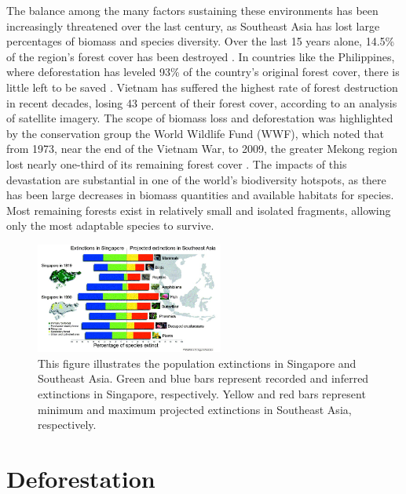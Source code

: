  The balance among the many factors sustaining these environments has been increasingly threatened over the last century, as Southeast Asia has lost large percentages of biomass and species diversity.  Over the last 15 years alone, 14.5\% of the region's forest cover has been destroyed \citep{gullison2007tropical}.  In countries like the Philippines, where deforestation has leveled 93\% of the country's original forest cover, there is little left to be saved \citep{sodhi2004southeast}. Vietnam has suffered the highest rate of forest destruction in recent decades, losing 43 percent of their forest cover, according to an analysis of satellite imagery. The scope of biomass loss and deforestation was highlighted by the conservation group the World Wildlife Fund (WWF), which noted that from 1973, near the end of the Vietnam War, to 2009, the greater Mekong region lost nearly one-third of its remaining forest cover \citep{sunderland2012evidence}. The impacts of this devastation are substantial in one of the world's biodiversity hotspots, as there has been large decreases in biomass quantities and available habitats for species. Most remaining forests exist in relatively small and isolated fragments, allowing only the most adaptable species to survive.
 


 \begin{figure}[ht]
    \centering
        \includegraphics[width = 0.55\textwidth]{graphics/extinction.jpg}
        \caption{This figure illustrates the population extinctions in Singapore and Southeast Asia. Green and blue bars represent recorded and inferred extinctions in Singapore, respectively. Yellow and red bars represent minimum and maximum projected extinctions in Southeast Asia, respectively. \citep{sodhi2004southeast}}
    \end{figure}


 

\section{Deforestation}


